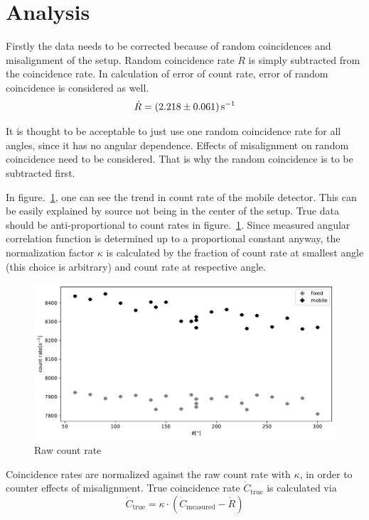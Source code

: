 \section{Analysis}
Firstly the data needs to be corrected because of random coincidences and misalignment of the setup. Random coincidence rate $\dot{R}$ is simply subtracted from the coincidence rate. In calculation of error of count rate, error of random coincidence is considered as well.
\begin{equation}
   \dot{R} = \SI{2.218 +- 0.061}{\per\s}
\end{equation}

It is thought to be acceptable to just use one random coincidence rate for all angles, since it has no angular dependence. Effects of misalignment on random coincidence need to be considered. That is why the random coincidence is to be subtracted first.

In figure.~\ref{fig:countRate}, one can see the trend in count rate of the mobile detector. This can be easily explained by source not being in the center of the setup. True data should be anti-proportional to count rates in figure.~\ref{fig:countRate}. Since measured angular correlation function is determined up to a proportional constant anyway, the normalization factor $\kappa$ is calculated by the fraction of count rate at smallest angle (this choice is arbitrary) and count rate at respective angle.
\begin{figure}[ht]
   \centering
   \includegraphics[width=0.8\linewidth]{./figs/countRate.pdf}
   \caption{Raw count rate}%
   \label{fig:countRate}
\end{figure}

Coincidence rates are normalized against the raw count rate with $\kappa$, in order to counter effects of misalignment. True coincidence rate $\dot{C}_{\text{true}}$ is calculated via
\begin{equation}
   \dot{C}_\text{true} = \kappa \cdot ( \dot{C}_\text{measured} - \dot{R})
\end{equation}


